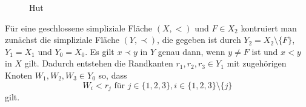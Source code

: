 \documentclass[12pt,titlepage,twoside,cleardoublepage]{article}
\theoremstyle{nummermitklammern}
\numberwithin{equation}{section}
\begin{document}
\begin{figure}[H]
\caption{Hut}
\end{figure}
Für eine geschlossene simpliziale Fläche $(X,<)$ und $F \in X_2$ kontruiert man zunächst die simpliziale Fläche $(Y,\prec)$, die gegeben ist durch $Y_2=X_2\setminus \{F\}$, $Y_1=X_1$ und $Y_0=X_0$. Es gilt $x\prec y$ in $Y$ genau dann, wenn $y\neq F$ ist und $x<y$ in $X$ gilt. Dadurch entstehen die Randkanten $r_1,r_2,r_3 \in Y_1$ mit zugehörigen Knoten $W_1,W_2,W_3\in Y_0$ so, dass 
\[
W_i < r_j \text{ für } j\in \{1,2,3\},i\in\{1,2,3\}\setminus \{j\}
\] gilt.
\end{document}
